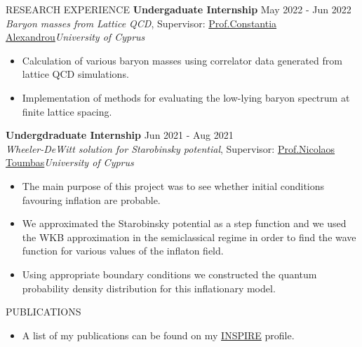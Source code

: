 \documentclass{resume} %
\begin{document}
\begin{rSection}{RESEARCH EXPERIENCE}
                \textbf{Undergaduate Internship} \hfill May 2022 - Jun 2022\\
                {\it Baryon masses from Lattice QCD}, Supervisor:  \href{https://www.cyi.ac.cy/index.php/castorc/about-the-center/castorc-our-people/itemlist/user/99-constantia-alexandrou.html}{Prof.\@ Constantia Alexandrou}\hfill \textit{University of Cyprus}
                \begin{itemize}
                        \itemsep -3pt {} 
                        \item Calculation of various baryon masses using correlator data generated from lattice QCD simulations.
                        \item Implementation of methods for evaluating the low-lying baryon spectrum at finite lattice spacing.
                \end{itemize}

                \textbf{Undergdraduate Internship} \hfill Jun 2021 - Aug 2021\\
                {\it Wheeler-DeWitt solution for Starobinsky potential}, Supervisor:  \href{https://www.ucy.ac.cy/directory/en/profile/nick}{Prof.\@ Nicolaos Toumbas}\hfill \textit{University of Cyprus}
                \begin{itemize}
                        \itemsep -3pt {} 
                        \item The main purpose of this project was to see whether initial conditions favouring inflation are probable.
                        \item We approximated the Starobinsky potential as a step function and we used the WKB approximation in the semiclassical regime in order to find the wave function for various values of the inflaton field.
                        \item Using appropriate boundary conditions we constructed the quantum probability density distribution for this inflationary model.
                \end{itemize}
        \end{rSection} 

        \bigbreak

        \begin{rSection}{PUBLICATIONS}
                \begin{itemize}
                        \item A list of my publications can be found on my \href{https://inspirehep.net/authors/2313765}{INSPIRE} profile.
                \end{itemize}
        \end{rSection}
\end{document}
